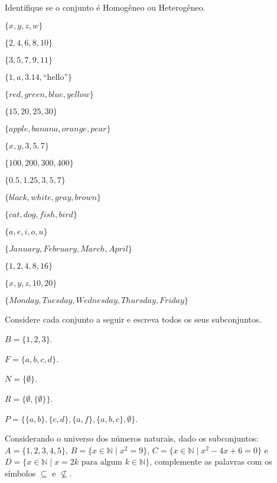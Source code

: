 \begin{questao}
  Identifique se o conjunto é Homogêneo ou Heterogêneo.
\end{questao}

\begin{exerList}
  \item $\{x, y, z, w\}$
  \item $\{2, 4, 6, 8, 10\}$
  \item $\{3, 5, 7, 9, 11\}$
  \item $\{1, a, 3.14, \text{``hello''}\}$
  \item $\{red, green, blue, yellow\}$
  \item $\{15, 20, 25, 30\}$
  \item $\{apple, banana, orange, pear\}$
  \item $\{x, y, 3, 5, 7\}$
  \item $\{100, 200, 300, 400\}$
  \item $\{0.5, 1.25, 3, 5, 7\}$
  \item $\{black, white, gray, brown\}$
  \item $\{cat, dog, fish, bird\}$
  \item $\{a, e, i, o, u\}$
  \item $\{January, February, March, April\}$
  \item $\{1, 2, 4, 8, 16\}$
  \item $\{x, y, z, 10, 20\}$
  \item $\{Monday, Tuesday, Wednesday, Thursday, Friday\}$
\end{exerList}

\begin{questao}\label{test:Conjuntos5}
	Considere cada conjunto a seguir e escreva todos os seus subconjuntos.
\end{questao}

\begin{exerList}
	\item $B = \{1, 2, 3\}$.
	\item $F = \{a, b, c, d\}$.
	\item $N = \{\emptyset\}$.
	\item $R = \{\emptyset, \{\emptyset\}\}$.
	\item $P = \{\{a, b\}, \{c, d\}, \{a, f\}, \{a, b, c\}, \emptyset\}$.
\end{exerList}

\begin{questao}\label{test:Conjuntos6}
	Considerando o universo dos números naturais, dado os subconjuntos:  $A = \{1, 2, 3, 4, 5\}$, $B = \{x \in \mathbb{N} \mid x^2 = 9\}$, $C = \{x \in \mathbb{N} \mid x^2 - 4x + 6 = 0\}$ e $D = \{x \in \mathbb{N} \mid  x = 2k \mbox{ para algum } k \in \mathbb{N}\}$, complemente as palavras com os símbolos $\subseteq$ e $\not\subseteq$.
\end{questao}

